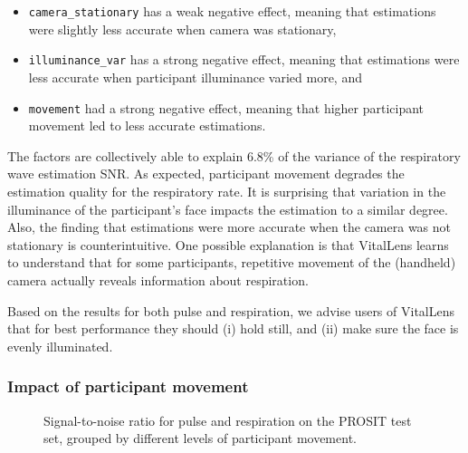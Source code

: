 \documentclass{article}
\begin{document}
\begin{itemize}
	\item \texttt{camera\_stationary} has a weak negative effect, meaning that estimations were slightly less accurate when camera was stationary,
	\item \texttt{illuminance\_var} has a strong negative effect, meaning that estimations were less accurate when participant illuminance varied more, and
	\item \texttt{movement} had a strong negative effect, meaning that higher participant movement led to less accurate estimations.
\end{itemize}

The factors are collectively able to explain 6.8\% of the variance of the respiratory wave estimation SNR.
As expected, participant movement degrades the estimation quality for the respiratory rate.
It is surprising that variation in the illuminance of the participant's face impacts the estimation to a similar degree.
Also, the finding that estimations were more accurate when the camera was not stationary is counterintuitive.
One possible explanation is that VitalLens learns to understand that for some participants, repetitive movement of the (handheld) camera actually reveals information about respiration.

Based on the results for both pulse and respiration, we advise users of VitalLens that for best performance they should (i) hold still, and (ii) make sure the face is evenly illuminated.

\subsubsection{Impact of participant movement}

\datatable

\begin{figure}[h!]
  \centering
  \caption{Signal-to-noise ratio for pulse and respiration on the PROSIT test set, grouped by different levels of participant movement.}
  \label{fig:impact-movement}
\end{figure}
\end{document}
